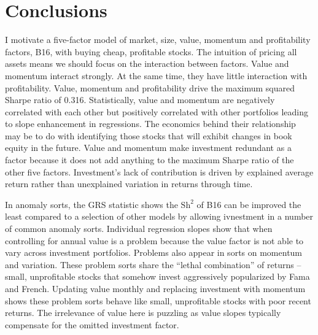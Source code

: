 
\section*{Conclusions}

I motivate a five-factor model of market, size, value, momentum and
profitability factors, B16, with buying cheap, profitable stocks. The intuition
of pricing all assets means we should focus on the interaction between factors.
Value and momentum interact strongly. At the same time, they have little
interaction with profitability. Value, momentum and profitability drive the
maximum squared Sharpe ratio of 0.316. Statistically, value and momentum are
negatively correlated with each other but positively correlated with other
portfolios leading to slope enhancement in regressions. The economics behind
their relationship may be to do with identifying those stocks that will exhibit
changes in book equity in the future. Value and momentum make investment
redundant as a factor because it does not add anything to the maximum Sharpe
ratio of the other five factors. Investment's lack of contribution is driven by
explained average return rather than unexplained variation in returns through
time.

In anomaly sorts, the GRS statistic shows the $\text{Sh}^2$ of B16 can be
improved the least compared to a selection of other models by allowing
ivnestment in a number of common anomaly sorts. Individual regression slopes
show that when controlling for annual value is a problem because the value
factor is not able to vary across investment portfolios. Problems also appear
in sorts on momentum and variation. These problem sorts share the ``lethal
combination” of returns -- small, unprofitable stocks that somehow invest
aggressively popularized by Fama and French.
Updating value monthly and replacing investment with momentum shows these
problem sorts behave like small, unprofitable stocks with poor recent returns.
The irrelevance of value here is puzzling as value slopes typically
compensate for the omitted investment factor.

